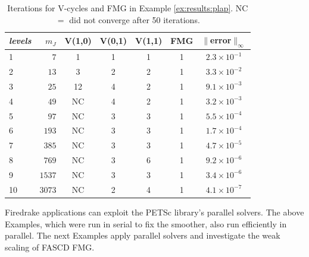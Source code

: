\documentclass[review,hidelinks,onefignum,onetabnum,final]{siamart220329}  %
\begin{document}
\begin{table}[ht]
\centering
\begin{tabular}{lr@{\hskip 7mm}c@{\hskip 3mm}c@{\hskip 3mm}c@{\hskip 4mm}c@{\hskip 6mm}c}
\toprule
\emph{levels} & $m_J$ & V(1,0) & V(0,1) & V(1,1) & FMG & $\|$error$\|_\infty$ \\
\midrule
 1 &    $7$ &  1 &  1 &  1 &  1 & $2.3 \times 10^{-1}$ \\
 2 &   $13$ &  3 &  2 &  2 &  1 & $3.3 \times 10^{-2}$ \\
 3 &   $25$ & 12 &  4 &  2 &  1 & $9.1 \times 10^{-3}$ \\
 4 &   $49$ & NC &  4 &  2 &  1 & $3.2 \times 10^{-3}$ \\
 5 &   $97$ & NC &  3 &  3 &  1 & $5.5 \times 10^{-4}$ \\
 6 &  $193$ & NC &  3 &  3 &  1 & $1.7 \times 10^{-4}$ \\
 7 &  $385$ & NC &  3 &  3 &  1 & $4.7 \times 10^{-5}$ \\
 8 &  $769$ & NC &  3 &  6 &  1 & $9.2 \times 10^{-6}$ \\
 9 & $1537$ & NC &  3 &  3 &  1 & $3.4 \times 10^{-6}$ \\
10 & $3073$ & NC &  2 &  4 &  1 & $4.1 \times 10^{-7}$ \\
\bottomrule
\end{tabular}
\bigskip
\caption{Iterations for V-cycles and FMG in Example \ref{ex:results:plap}.  NC $=$ did not converge after 50 iterations.}
\label{tab:results:fastplap1d}
\end{table}

Firedrake applications can exploit the PETSc \cite{Balayetal2023} library's parallel solvers.  The above Examples, which were run in serial to fix the smoother, also run efficiently in parallel.  The next Examples apply parallel solvers and investigate the weak scaling of FASCD FMG.
\end{document}
